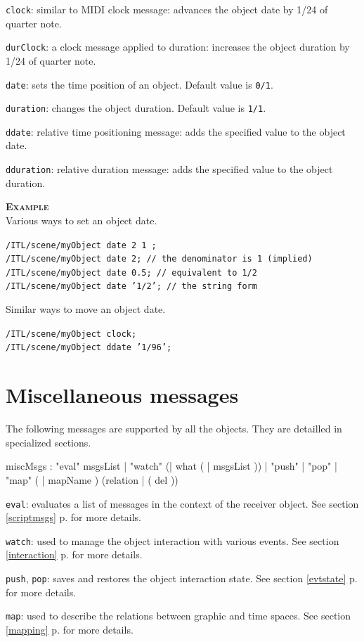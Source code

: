 \documentclass[a4paper,twoside]{report}
\newcommand{\toplevel}[1]	{\chapter{#1}}
\newcommand{\fullref}[1]	{\ref{#1} p.\pageref{#1}}
\newcommand{\OSC}[1]		{\texttt{#1}}
\newcommand{\values}[1]		{\texttt{#1}}
\newcommand{\example}		{\textbf{\hspace{-1.5cm}\textbf{\textsc{Example }}}}
\let\olditemize\itemize
\let\oldenditemize\enditemize
\renewenvironment{itemize} 	{\olditemize \setlength{\itemsep}{1mm}}{\oldenditemize}
\newcommand{\sample}	[1]			{\vspace{-2mm}\begin{center}\colorbox{mygrey}{
								\begin{minipage}[t]{0.9\columnwidth} 
								{\small \texttt{#1}}
								\end{minipage}}\end{center}}
\begin{document}
\begin{itemize}
\item \OSC{clock}: similar to MIDI clock message: advances the object date by 1/24 of quarter note.
\item \OSC{durClock}: a clock message applied to duration: increases the object duration by 1/24 of quarter note.
\item \OSC{date}: sets the time position of an object. Default value is \values{0/1}.
\item \OSC{duration}: changes the object duration. Default value is \values{1/1}.
\item \OSC{ddate}: relative time positioning message: adds the specified value to the object date.
\item \OSC{dduration}: relative duration message: adds the specified value to the object duration.
\end{itemize}


\example \\
Various ways to set an object date.
\sample{/ITL/scene/myObject date 2 1 ;\\
/ITL/scene/myObject date 2;     \hspace{1.2cm}// the denominator is 1 (implied) \\
/ITL/scene/myObject date 0.5;   \hspace{7mm} // equivalent to 1/2 \\
/ITL/scene/myObject date '1/2'; \hspace{4mm} // the string form
}
Similar ways to move an object date.
\sample{/ITL/scene/myObject clock;   \\
/ITL/scene/myObject ddate '1/96';
}

\toplevel{Miscellaneous messages}
\label{miscmsgs}

The following messages are supported by all the objects. They are detailled in specialized sections.

\begin{rail}
miscMsgs :  
		 	"eval" msgsList
		|   "watch" (| what ( | msgsList ))
		| 	"push"
		| 	"pop"
		| 	"map" ( | mapName ) (relation | ( del ))
\end{rail}

\begin{itemize}
\item \OSC{eval}: evaluates a list of messages in the context of the receiver object. See section \fullref{scriptmsgs} for more details.
\item \OSC{watch}: used to manage the object interaction with various events. See section \fullref{interaction} for more details.
\item \OSC{push}, \OSC{pop}: saves and restores the object interaction state. See section \fullref{evtstate} for more details.
\item \OSC{map}: used to describe the relations between graphic and time spaces. See section \fullref{mapping} for more details.
\end{itemize}
\end{document}
